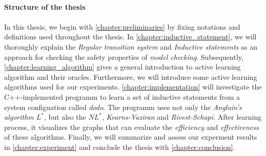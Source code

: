 \paragraph*{Structure of the thesis}
\paragraph*{}

In this thesis, we begin with \autoref{chapter:preliminaries} by fixing notations and 
definitions used throughout the thesis.
In \autoref{chapter:inductive_statement}, we will thoroughly explain the
\textit{Regular transition system} and \textit{Inductive statements} as an approach 
for checking the safety properties of \textit{model checking}. 
Subsequently, \autoref{chapter:learning_algorithm} gives a general introduction
to active learning algorithm and their oracles.
Furthermore, we will introduce some active learning algorithms used 
for our experiments.
\autoref{chapter:implementation} will investigate the C++-implemented programm to
learn a set of inductive statements from a system configuation called \textit{dodo}. 
The programm uses not only the \textit{Angluin's algorithm $L^*$}, but also 
the \textit{$NL^*$}, \textit{Kearns-Vaziran} and \textit{Rivest-Schapi}.
After learning process, it visualizes the graphs that can evaluate 
the \textit{efficiency} and \textit{effectiveness} of these algorithms.
Finally, we will summarize and assess our experment results in \autoref{chapter:experiment} 
and conclude the thesis with \autoref{chapter:conclusion}.